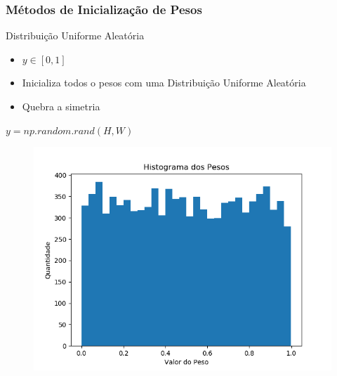 \documentclass{beamer}
\begin{document}
\begin{frame}
	\frametitle{Métodos de Inicialização de Pesos}
	\begin{block}{Distribuição Uniforme Aleatória}
		\begin{itemize}
			\item $y \in [0, 1]$ 
			\item Inicializa todos o pesos com uma Distribuição Uniforme Aleatória 
			\item Quebra a simetria
		\end{itemize}
			$	y = np.random.rand(H, W)$
		\begin{figure}
			\centering
			\includegraphics[width=0.5\linewidth]{figures/pesos_uniform.png}
		\end{figure}
	\end{block}
\end{frame}
\end{document}
